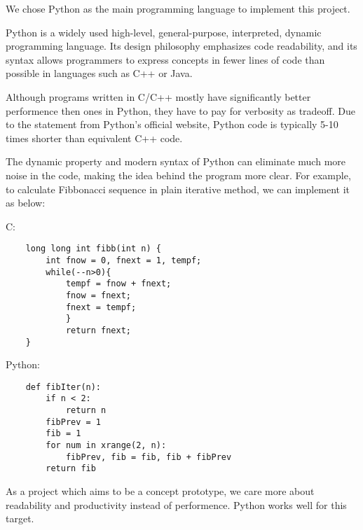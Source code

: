 \documentclass[../main.tex]{subfiles}
\begin{document}
We chose Python as the main programming language to implement this project.

Python is a widely used high-level, general-purpose, interpreted, dynamic programming language. 
Its design philosophy emphasizes code readability, 
and its syntax allows programmers to express concepts in fewer lines of code than possible in languages such as C++ or Java.

Although programs written in C/C++ mostly have significantly better performence then ones in Python, they have to pay for verbosity as tradeoff.
Due to the statement from Python's official website, Python code is typically 5-10 times shorter than equivalent C++ code.

The dynamic property and modern syntax of Python can eliminate much more noise in the code, making the idea behind the program more clear. For example, to calculate Fibbonacci sequence in plain iterative method, we can implement it as below:

C:

\begin{verbatim}
    long long int fibb(int n) {
        int fnow = 0, fnext = 1, tempf;
        while(--n>0){
            tempf = fnow + fnext;
            fnow = fnext;
            fnext = tempf;
            }
            return fnext;   
    }
\end{verbatim}

Python:
\begin{verbatim}
    def fibIter(n):
        if n < 2:
            return n
        fibPrev = 1
        fib = 1
        for num in xrange(2, n):
            fibPrev, fib = fib, fib + fibPrev
        return fib
\end{verbatim}

As a project which aims to be a concept prototype, we care more about readability and productivity instead of performence. Python works well for this target.
\end{document}
